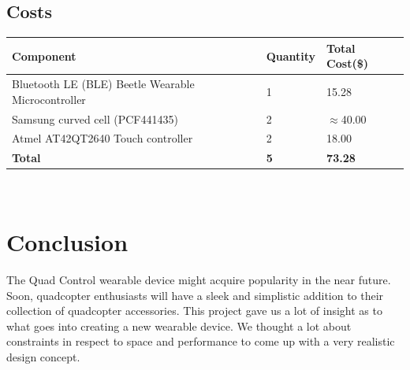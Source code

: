 \documentclass[12pt,letterpaper]{article}
\begin{document}
\subsection*{Costs}
\begin{tabular}{| l | l | l |}
	\hline
	Component & Quantity & Total Cost(\$) \\ \hline
	Bluetooth LE (BLE) Beetle Wearable Microcontroller & 1 & 15.28 \\ \hline
	Samsung curved cell (PCF441435) & 2 & $\approx$40.00\\ \hline
	Atmel AT42QT2640 Touch controller & 2 & 18.00\\ \hline
	\textbf{Total} & \textbf{5} & \textbf{73.28}\\ \hline
\end{tabular} \\



\section*{Conclusion}
The Quad Control wearable device might acquire popularity in the near future. Soon, quadcopter enthusiasts will have a sleek and simplistic addition to their collection of quadcopter accessories. This project gave us a lot of insight as to what goes into creating a new wearable device. We thought a lot about constraints in respect to space and performance to come up with a very realistic design concept. 

\newpage
\end{document}
